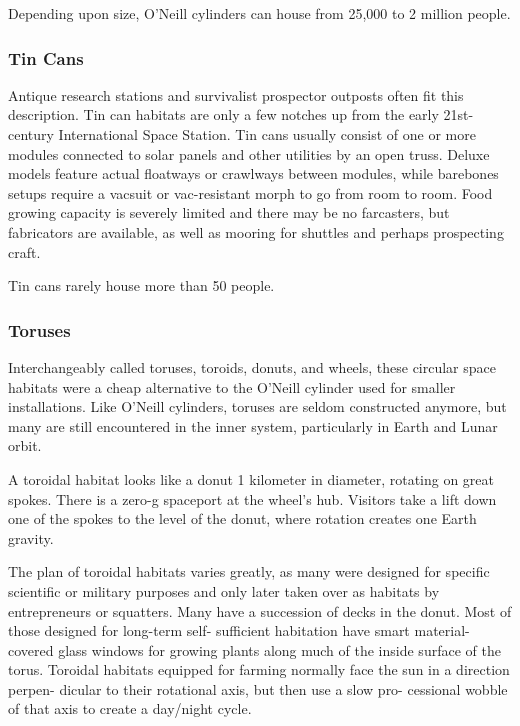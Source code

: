 Depending upon size, O'Neill cylinders can house 
from 25,000 to 2 million people.

\subsubsection{Tin Cans}

Antique research stations and survivalist prospector 
outposts often fit this description. Tin can habitats 
are only a few notches up from the early 21st-century 
International Space Station. Tin cans usually consist 
of one or more modules connected to solar panels 
and other utilities by an open truss. Deluxe models 
feature actual floatways or crawlways between 
modules, while barebones setups require a vacsuit or 
vac-resistant morph to go from room to room. Food 
growing capacity is severely limited and there may be 
no farcasters, but fabricators are available, as well as 
mooring for shuttles and perhaps prospecting craft.

Tin cans rarely house more than 50 people.

\subsubsection{Toruses}

Interchangeably called toruses, toroids, donuts, and 
wheels, these circular space habitats were a cheap 
alternative to the O'Neill cylinder used for smaller 
installations. Like O'Neill cylinders, toruses are seldom 
constructed anymore, but many are still encountered in 
the inner system, particularly in Earth and Lunar orbit.

A toroidal habitat looks like a donut 1 kilometer in 
diameter, rotating on great spokes. There is a zero-g 
spaceport at the wheel's hub. Visitors take a lift down 
one of the spokes to the level of the donut, where 
rotation creates one Earth gravity.

The plan of toroidal habitats varies greatly, as many 
were designed for specific scientific or military purposes 
and only later taken over as habitats by entrepreneurs 
or squatters. Many have a succession of decks in the 
donut. Most of those designed for long-term self-
sufficient habitation have smart material-covered glass 
windows for growing plants along much of the inside 
surface of the torus. Toroidal habitats equipped for 
farming normally face the sun in a direction perpen-
dicular to their rotational axis, but then use a slow pro-
cessional wobble of that axis to create a day/night cycle.

